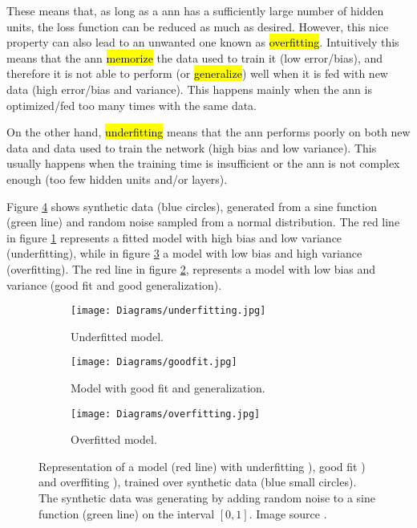 These means that, as long as a \gls{ann} has a sufficiently large number of hidden units, the loss function can be reduced as much as desired. However, this nice property can also lead to an unwanted one known as \hl{overfitting}.
Intuitively this means that the \gls{ann} \hl{memorize} the data used to train it (low error/bias), and therefore it is not able to perform (or \hl{generalize}) well when it is fed with new data (high error/bias and variance). This happens mainly when the \gls{ann} is optimized/fed too many times with the same data.

On the other hand, \hl{underfitting} means that the \gls{ann} performs poorly on both new data and data used to train the network (high bias and low variance). This usually happens when the training time is insufficient or the \gls{ann} is not complex enough (too few hidden units and/or layers).

Figure \ref{fig:basics:ann:fitting} shows synthetic data (blue circles), generated from a sine function (green line) and random noise sampled from a normal distribution.
The red line in figure \ref{fig:basics:ann:fitting:under} represents a fitted model with high bias and low variance (underfitting), while in figure \ref{fig:basics:ann:fitting:over} a model with low bias and high variance (overfitting). The red line in figure \ref{fig:basics:ann:fitting:good}, represents a model with low bias and variance (good fit and good generalization).

\begin{figure}[htb]
  \centering
  \begin{subfigure}[t]{.3\linewidth}
    \texttt{[image: Diagrams/underfitting.jpg]}
    \caption{Underfitted model.}
    \label{fig:basics:ann:fitting:under}
  \end{subfigure}
  \vspace{3mm}
  \begin{subfigure}[t]{.3\linewidth}
    \texttt{[image: Diagrams/goodfit.jpg]}
    \caption{Model with good fit and generalization.}
    \label{fig:basics:ann:fitting:good}
  \end{subfigure}
  \vspace{3mm}
  \begin{subfigure}[t]{.3\linewidth}
    \texttt{[image: Diagrams/overfitting.jpg]}
    \caption{Overfitted model.}
    \label{fig:basics:ann:fitting:over}
  \end{subfigure}
  \caption{Representation of a model (red line) with underfitting ), good fit ) and overffiting ), trained over synthetic data (blue small circles). The synthetic data was generating by adding random noise to a sine function (green line) on the interval $[0,1]$. Image source \cite{bishop2006pattern}.}
  \label{fig:basics:ann:fitting}
\end{figure}

